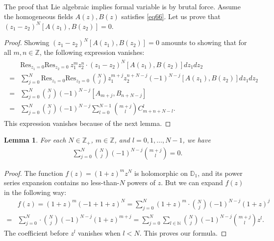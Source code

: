 \documentclass[11pt,b5paper,notitlepage]{article}
\theoremstyle{definition}
\theoremstyle{plain}
\newtheorem{lm}[df]{Lemma}
\newcommand{\Res}{\mathrm{Res}}
\newcommand{\Nbb}{\mathbb N}
\newcommand{\Zbb}{\mathbb Z}
\newcommand{\Dbb}{\mathbb D}
\numberwithin{equation}{section}
\begin{document}
\subsection{}\label{lb67}

The proof that Lie algebraic implies formal variable is by brutal force. Assume the homogeneous fields $A(z),B(z)$ satisfies \eqref{eq66}. Let us prove that $(z_1-z_2)^N[A(z_1),B(z_2)]=0$.

\begin{proof}
Showing $(z_1-z_2)^N[A(z_1),B(z_2)]=0$ amounts to showing that  for all $m,n\in\Zbb$, the following expression vanishes:
\begin{align}\label{eq102}
\begin{aligned}
&\Res_{z_1=0}\Res_{z_2=0}~z_1^mz_2^n\cdot (z_1-z_2)^N[A(z_1),B(z_2)]dz_1dz_2\\
=&\sum_{j=0}^N \Res_{z_1=0}\Res_{z_2=0}~{N\choose j}z_1^{m+j}z_2^{n+N-j}(-1)^{N-j}[A(z_1),B(z_2)]dz_1dz_2\\
=&\sum_{j=0}^N{N\choose j}(-1)^{N-j}[A_{m+j},B_{n+N-j}]\\
=&\sum_{j=0}^N{N\choose j}(-1)^{N-j}\sum_{l=0}^{N-1}{m+j\choose l}C^l_{m+n+N-l}.	
\end{aligned}
\end{align}
This expression vanishes because of  the next lemma.
\end{proof}


\begin{lm}
For each $N\in\Zbb_+$, $m\in\Zbb$, and  $l=0,1,\dots,N-1$, we have
\begin{align*}
\sum_{j=0}^N{N\choose j}(-1)^{N-j}{m+j\choose l}=0.	
\end{align*}
\end{lm}

\begin{proof}
The function $f(z)=(1+z)^mz^N$ is holomorphic on $\Dbb_1$, and its power series expansion contains no less-than-$N$ powers of $z$. But we can expand $f(z)$ in the following way:
\begin{align*}
&f(z)=(1+z)^m(-1+1+z)^N=\sum_{j=0}^N(1+z)^m\cdot{N\choose j} (-1)^{N-j}(1+z)^j\\
=&	\sum_{j=0}^N \cdot{N\choose j}(-1)^{N-j}(1+z)^{m+j}=\sum_{j=0}^N\sum_{l\in\Nbb} {N\choose j}(-1)^{N-j}{m+j\choose l}z^l.
\end{align*}
The coefficient before $z^l$ vanishes when $l<N$. This proves our formula.
\end{proof}
\end{document}
